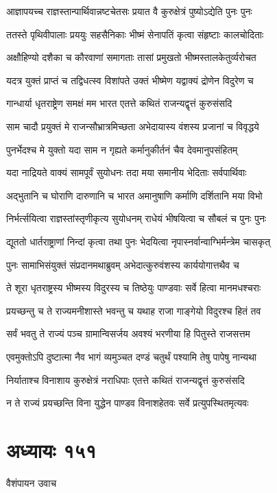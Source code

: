\twolineshloka
{आज्ञापयच्च राज्ञस्तान्पार्थिवान्नष्टचेतसः}
{प्रयात वै कुरुक्षेत्रं पुष्योऽद्येति पुनः पुनः}


\twolineshloka
{ततस्ते पृथिवीपालाः प्रययुः सहसैनिकाः}
{भीष्मं सेनापतिं कृत्वा संहृष्टाः कालचोदिताः}


\twolineshloka
{अक्षौहिण्यो दशैका च कौरवाणां समागताः}
{तासां प्रमुखतो भीष्मस्तालकेतुर्व्यरोचत}


\twolineshloka
{यदत्र युक्तं प्राप्तं च तद्विधत्स्व विशांपते}
{उक्तं भीष्मेण यद्वाक्यं द्रोणेन विदुरेण च}


\twolineshloka
{गान्धार्या धृतराष्ट्रेण समक्षं मम भारत}
{एतत्ते कथितं राजन्यद्वृत्तं कुरुसंसदि}


\twolineshloka
{साम चादौ प्रयुक्तं मे राजन्सौभ्रात्रमिच्छता}
{अभेदायास्य वंशस्य प्रजानां च विवृद्धये}


\twolineshloka
{पुनर्भेदश्च मे युक्तो यदा साम न गृह्यते}
{कर्मानुकीर्तनं चैव देवमानुपसंहितम्}


\twolineshloka
{यदा नाद्रियते वाक्यं सामपूर्वं सुयोधनः}
{तदा मया समानीय भेदिताः सर्वपार्थिवाः}


\twolineshloka
{अद्भुतानि च घोराणि दारुणानि च भारत}
{अमानुषाणि कर्माणि दर्शितानि मया विभो}


\twolineshloka
{निर्भर्त्सयित्वा राज्ञस्तांस्तृणीकृत्य सुयोधनम्}
{राधेयं भीषयित्वा च सौबलं च पुनः पुनः}


\twolineshloka
{द्यूततो धार्तराष्ट्राणां निन्दां कृत्वा तथा पुनः}
{भेदयित्वा नृपास्नर्वान्वाग्भिर्मन्त्रेम चासकृत्}


\twolineshloka
{पुनः सामाभिसंयुक्तं संप्रदानमथाब्रुवम्}
{अभेदात्कुरुवंशस्य कार्ययोगात्तथैव च}


\twolineshloka
{ते शूरा धृतराष्ट्रस्य भीष्मस्य विदुरस्य च}
{तिष्ठेयुः पाण्डवाः सर्वे हित्वा मानमधश्चराः}


\twolineshloka
{प्रयच्छन्तु च ते राज्यमनीशास्ते भवन्तु च}
{यथाह राजा गाङ्गेयो विदुरश्च हितं तव}


\twolineshloka
{सर्वं भवतु ते राज्यं पञ्च ग्रामान्विसर्जय}
{अवश्यं भरणीया हि पितुस्ते राजसत्तम}


\twolineshloka
{एवमुक्तोऽपि दुष्टात्मा नैव भागं व्यमुञ्चत}
{दण्डं चतुर्थं पश्यामि तेषु पापेषु नान्यथा}


\twolineshloka
{निर्याताश्च विनाशाय कुरुक्षेत्रं नराधिपाः}
{एतत्ते कथितं राजन्यद्वृत्तं कुरुसंसदि}


\twolineshloka
{न ते राज्यं प्रयच्छन्ति विना युद्धेन पाण्डव}
{विनाशहेतवः सर्वे प्रत्युपस्थितमृत्यवः}


\chapter{अध्यायः १५१}
\twolineshloka
{वैशंपायन उवाच}
{}


